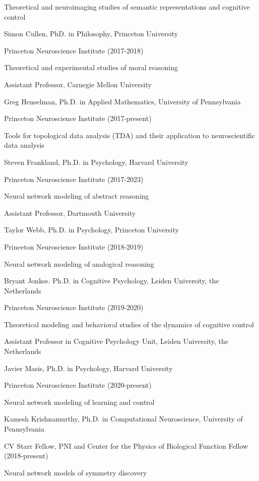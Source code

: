 \documentclass[10 pt]{article}
\begin{document}
Theoretical and neuroimaging studies of semantic representations and cognitive control
    \medskip

Simon Cullen, PhD. in Philosophy, Princeton University

Princeton Neuroscience Institute (2017-2018)

Theoretical and experimental studies of moral reasoning

Assistant Professor, Carnegie Mellon University
    \medskip

Greg Henselman, Ph.D. in Applied Mathematics, University of Pennsylvania

Princeton Neuroscience Institute (2017-present)

Tools for topological data analysis (TDA) and their application to neuroscientific data analysis
    \medskip

Steven Frankland, Ph.D. in Psychology, Harvard University

Princeton Neuroscience Institute (2017-2023)

Neural network modeling of abstract reasoning

Assistant Professor, Dartmouth University
    \medskip

Taylor Webb, Ph.D. in Psychology, Princeton University

Princeton Neuroscience Institute (2018-2019)

Neural network modeling of analogical reasoning
    \medskip

Bryant Jonkes. Ph.D. in Cognitive Psychology, Leiden University, the Netherlands

Princeton Neuroscience Institute (2019-2020)

Theoretical modeling and behavioral studies of the dynamics of cognitive control

Assistant Professor in Cognitive Psychology Unit, Leiden University, the Netherlands
    \medskip


Javier Masis, Ph.D. in Psychology, Harvard University

Princeton Neuroscience Institute (2020-present)


Neural network modeling of learning and control
    \medskip

Kamesh Krishnamurthy, Ph.D. in Computational Neuroscience, University of Pennsylvania

CV Starr Fellow, PNI and Center for the Physics of Biological Function Fellow (2018-present)

Neural network models of symmetry discovery
    \medskip
\end{document}
